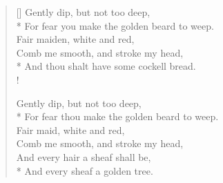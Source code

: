 \settowidth{\versewidth}{For fear you make the golden beard to weep.}
\begin{verse}[\versewidth]
    Gently dip, but not too deep,\\*
    For fear you make the golden beard to weep.\\
    Fair maiden, white and red,\\
    Comb me smooth, and stroke my head,\\*
    And thou shalt have some cockell bread.\\!

    Gently dip, but not too deep,\\*
    For fear thou make the golden beard to weep.\\
    Fair maid, white and red,\\
    Comb me smooth, and stroke my head,\\
    And every hair a sheaf shall be,\\*
    And every sheaf a golden tree.
\end{verse}
